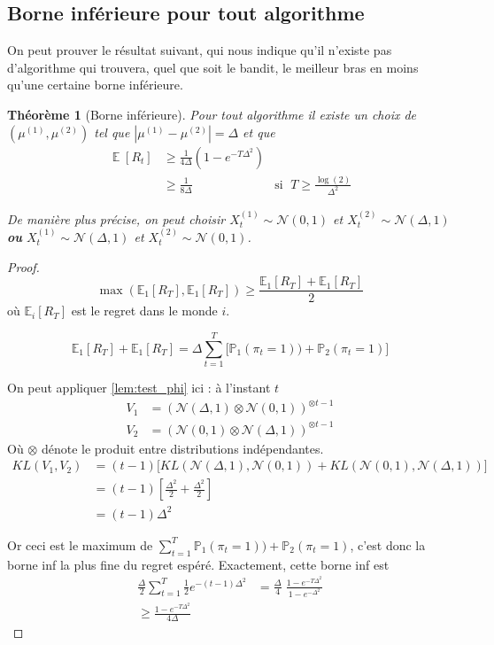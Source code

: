 \documentclass{article}
\DeclareMathOperator*{\E}{\mathbb{E}}
\newtheorem{theorem}{Théorème}[section]
\theoremstyle{remark}
\theoremstyle{remark}
\begin{document}
\subsection{Borne inférieure pour tout algorithme}

On peut prouver le résultat suivant, qui nous indique qu'il n'existe pas d'algorithme qui trouvera, quel que soit le bandit, le meilleur bras en moins qu'une certaine borne inférieure.

\begin{theorem}[Borne inférieure]
  Pour tout algorithme il existe un choix de $(\mu^{(1)}, \mu^{(2)})$ tel que $|\mu^{(1)} - \mu^{(2)}| = \Delta$ et que
  \begin{align*}
    \E[R_t] &\geq \frac{1}{4\Delta}\left( 1-e^{-T\Delta^2} \right) \\
    &\geq \frac{1}{8\Delta} & \text{si } \; T \geq \frac{\log(2)}{\Delta^2}
  \end{align*}

  De manière plus précise, on peut choisir $X^{(1)}_t \sim \mathcal{N}(0,1)$ et $X^{(2)}_t \sim \mathcal{N}(\Delta,1)$ \textbf{ou} $X^{(1)}_t \sim \mathcal{N}(\Delta,1)$ et $X^{(2)}_t \sim \mathcal{N}(0,1)$.
\end{theorem}

\begin{proof}
  $$
  \max\left( \mathbb{E}_1[R_T], \mathbb{E}_1[R_T] \right) \geq \frac{\mathbb{E}_1[R_T] + \mathbb{E}_1[R_T]}{2}
  $$
  où $\mathbb{E}_i[R_T]$ est le regret dans le monde $i$.

  $$
  \mathbb{E}_1[R_T] + \mathbb{E}_1[R_T] = \Delta \sum_{t=1}^T \big[ \mathbb{P}_1(\pi_t=1)) + \mathbb{P}_2(\pi_t = 1) \big]
  $$

  On peut appliquer \autoref{lem:test_phi} ici : à l'instant $t$
  \begin{align*}
    V_1 &= (\mathcal{N}(\Delta, 1) \otimes \mathcal{N}(0, 1))^{\otimes t-1} \\
    V_2 &= (\mathcal{N}(0, 1) \otimes \mathcal{N}(\Delta, 1))^{\otimes t-1}
  \end{align*}
  Où $\otimes$ dénote le produit entre distributions indépendantes.
  \begin{align*}
    KL(V_1, V_2) &= (t-1) \big[ KL(\mathcal{N}(\Delta, 1), \mathcal{N}(0, 1)) + KL(\mathcal{N}(0, 1), \mathcal{N}(\Delta, 1)) \big] \\
    &= (t-1) \left[ \frac{\Delta^2}{2} + \frac{\Delta^2}{2} \right] \\
    &= (t-1) \Delta^2
  \end{align*}

  Or ceci est le maximum de $\sum\limits_{t=1}^T\mathbb{P}_1(\pi_t=1)) + \mathbb{P}_2(\pi_t = 1)$, c'est donc la borne inf la plus fine du regret espéré. Exactement, cette borne inf est
  \begin{align*}
    \frac{\Delta}{2} \sum_{t=1}^T \frac{1}{2} e^{-(t-1)\Delta^2} &= \frac{\Delta}{4} \; \frac{1-e^{-T\Delta^2}}{1-e^{-\Delta^2}} \\
    \geq \frac{1-e^{-T\Delta^2}}{4\Delta}
  \end{align*}
\end{proof}
\end{document}
